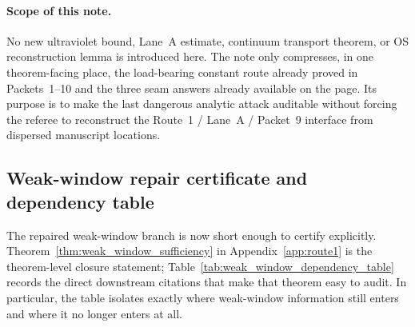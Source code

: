\paragraph{Scope of this note.}
No new ultraviolet bound, Lane~A estimate, continuum transport theorem, or OS reconstruction lemma is introduced here.
The note only compresses, in one theorem-facing place, the load-bearing constant route already proved in Packets~1--10 and the three seam answers already available on the page.
Its purpose is to make the last dangerous analytic attack auditable without forcing the referee to reconstruct the Route~1 / Lane~A / Packet~9 interface from dispersed manuscript locations.

\subsection{Weak-window repair certificate and dependency table}
\label{subsec:weak_window_dependency_table}

The repaired weak-window branch is now short enough to certify explicitly.
Theorem~\ref{thm:weak_window_sufficiency} in Appendix~\ref{app:route1} is the theorem-level closure statement;
Table~\ref{tab:weak_window_dependency_table} records the direct downstream citations that make that theorem easy to audit.
In particular, the table isolates exactly where weak-window information still enters and where it no longer enters at all.

